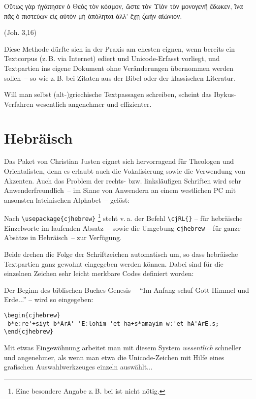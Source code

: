 \begin{otherlanguage}{polutonikogreek}
Οὕτως γὰρ ἠγάπησεν ὁ Θεὸς τὸν κόσμον, ὥστε τὸν Υἱὸν τὸν μονογενῆ ἔδωκεν, 
ἵνα πᾶς ὁ πιστεύων εἰς αὐτὸν μὴ ἀπόληται ἀλλ’ ἔχῃ ζωὴν αἰώνιον.
\end{otherlanguage}
(Joh. 3,16)

Diese Methode dürfte sich in der Praxis am ehesten eignen, wenn bereits ein Textcorpus
(z.\,B. via Internet) ediert und Unicode-Erfasst vorliegt, und Textpartien ins eigene Dokument
ohne Veränderungen übernommen werden sollen~-- so wie z.\,B. bei Zitaten aus der Bibel oder
der klassischen Literatur.

Will man selbst (alt-)griechische Textpassagen schreiben, scheint das Ibykus-Verfahren
wesentlich angenehmer und effizienter.


\section{Hebräisch}

Das Paket  von Christian Justen eignet sich hervorragend für 
Theologen und Orientalisten, denn es erlaubt auch die Vokalisierung sowie die Verwendung 
von Akzenten. Auch das Problem der rechts- bzw. linksläufigen Schriften wird sehr
Anwenderfreundlich~-- im Sinne von Anwendern an einem westlichen PC mit ansonsten 
lateinischen Alphabet~-- gelöst:

Nach \lstinline/\usepackage{cjhebrew}/%
\footnote{Eine besondere Angabe z.\,B. bei  ist nicht nötig.}
steht v.\,a. der Befehl \lstinline/\cjRL{}/ 
-- für hebräische Einzelworte im laufenden Absatz~-- sowie die 
Umgebung \lstinline/cjhebrew/ 
-- für ganze Absätze in Hebräisch~-- zur Verfügung.

Beide drehen die Folge der Schriftzeichen automatisch um, so dass hebräische Textpartien
ganz gewohnt eingegeben werden können. Dabei sind für die einzelnen Zeichen sehr leicht 
merkbare Codes definiert worden:

Der Beginn des biblischen Buches Genesis~-- \enquote{Im Anfang schuf Gott Himmel und Erde...} --
wird so eingegeben:

\begin{lstlisting}
\begin{cjhebrew}
 b*e:re'+siyt b*ArA' 'E:lohim 'et ha+s*amayim w:'et hA'ArE.s;
\end{cjhebrew} 
\end{lstlisting}

Mit etwas Eingewöhnung arbeitet man mit diesem System \emph{wesentlich} schneller und 
angenehmer, als wenn man etwa die Unicode-Zeichen mit Hilfe eines grafischen Auswahlwerkzeuges
einzeln auswählt...

